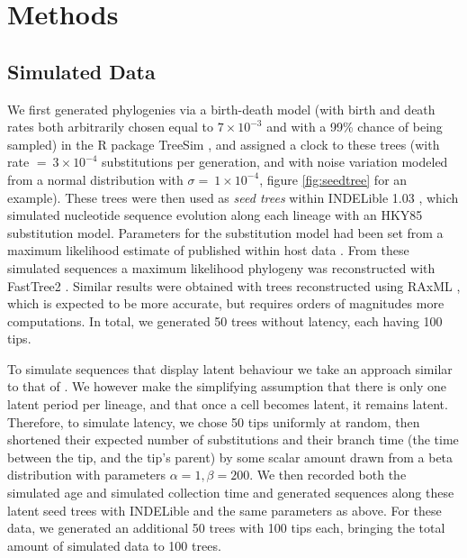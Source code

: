 \section * {Methods} \label{sec:methods}
\subsection * {Simulated Data} \label{subsec:simdata}

We first generated phylogenies via a birth-death model (with birth and death rates both arbitrarily chosen equal to $7\times 10^{-3}$ and with a 99\% chance of being sampled) in the R package TreeSim \citep{TreeSim, Stradler13, Boskova14}, and assigned a clock to these trees (with rate $ = \ 3\times 10^{-4}$ substitutions per generation, and with noise variation modeled from a normal distribution with $\sigma = \ 1\times 10^{-4}$, figure \ref{fig:seedtree} for an example).
These trees were then used as {\em seed trees} within INDELible 1.03 \citep{Indelible09}, which simulated nucleotide sequence evolution along each lineage with an HKY85 \citep{HKY85} substitution model.
Parameters for the substitution model had been set from a maximum likelihood estimate of published within host data \citep{McCloskey14}. 
From these simulated sequences a maximum likelihood phylogeny was reconstructed with FastTree2 \citep{FastTree10}.
Similar results were obtained with trees reconstructed using RAxML \citep{Raxml14}, which is expected to be more accurate, but requires orders of magnitudes more computations.
In total, we generated 50 trees without latency, each having 100 tips. 

To simulate sequences that display latent behaviour we take an approach similar to that of \cite{Immonen14}. We however make the simplifying assumption that there is only one latent period per lineage, and that once a cell becomes latent, it remains latent.
Therefore, to simulate latency, we chose 50 tips uniformly at random, then shortened their expected number of substitutions and their branch time (the time between the tip, and the tip's parent) by some scalar amount drawn from a beta distribution with parameters $\alpha=1, \beta=200$.
We then recorded both the simulated age and simulated collection time and generated sequences along these latent seed trees with INDELible and the same parameters as above. 
For these data, we generated an additional 50 trees with 100 tips each, bringing the total amount of simulated data to 100 trees.


